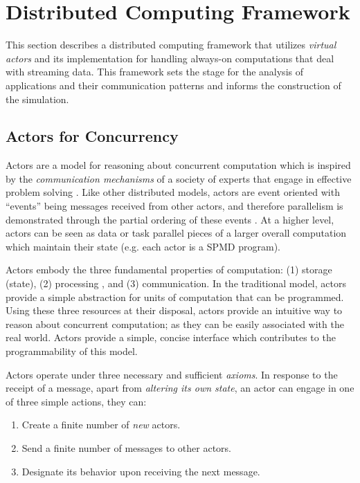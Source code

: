 \documentclass[conference,twocolumn,10pt]{IEEEtran}
\begin{document}
\section{Distributed Computing Framework}

This section describes a distributed computing framework that utilizes \textit{virtual actors} and its implementation for handling always-on computations that deal with streaming data. This framework sets the stage for the analysis of applications and their communication patterns and informs the construction of the simulation.

\subsection{Actors for Concurrency}

Actors are a model for reasoning about concurrent computation which is inspired by the \textit{communication mechanisms} of a society of experts that engage in effective problem solving \cite{hewitt_viewing_1977}.  Like other distributed models, actors are event oriented with ``events'' being messages received from other actors, and therefore parallelism is demonstrated through the partial ordering of these events \cite{agha_actors:_1985}. At a higher level, actors can be seen as data or task parallel pieces of a larger overall computation which maintain their state (e.g. each actor is a SPMD program).

Actors embody the three fundamental properties of computation: (1) storage (state), (2) processing , and (3) communication. In the traditional model, actors provide a simple abstraction for units of computation that can be programmed. Using these three resources at their disposal, actors provide an intuitive way to reason about concurrent computation; as they can be easily associated with the real world. Actors provide a simple, concise interface which contributes to the programmability of this model.

Actors operate under three necessary and sufficient \textit{axioms}. In response to the receipt of a message, apart from \textit{altering its own state}, an actor can engage in one of three simple actions, they can:

\begin{enumerate}
    \item Create a finite number of \textit{new} actors.
    \item Send a finite number of messages to other actors.
    \item Designate its behavior upon receiving the next message.
\end{enumerate}
\end{document}
